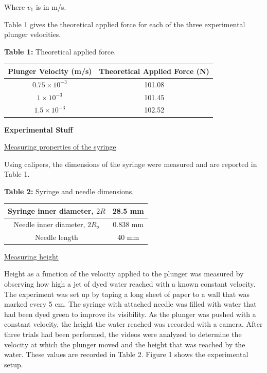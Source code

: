\documentclass{article}
\begin{document}
Where $v_{1}$ is in m/s.

Table 1 gives the theoretical applied force for each of the three experimental plunger velocities.
\begin{center}\textbf{Table 1:} Theoretical applied force. \end{center}
\begin{center}
\begin{tabular}{| c | c |}
\hline
\textbf{Plunger Velocity (m/s)} & \textbf{Theoretical Applied Force (N)} \\
\hline
$0.75 \times 10^{-3}$ & 101.08 \\  
\hline
$1 \times 10^{-3}$ & 101.45  \\
\hline
$1.5 \times 10^{-3}$ & 102.52  \\  
\hline
\end{tabular}
\end{center}


\textbf{Experimental Stuff}

\underline{Measuring properties of the syringe}

Using calipers, the dimensions of the syringe were measured and are reported in Table 1.

\begin{center}\textbf{Table 2:} Syringe and needle dimensions. \end{center}
\begin{center}
\begin{tabular}{| c | c |}
\hline
Syringe inner diameter, $2R$ & 28.5 mm \\ 
\hline
Needle inner diameter, $2R_{o}$ & 0.838 mm \\  
\hline
Needle length & 40 mm \\  
\hline
\end{tabular}
\end{center}

\underline{Measuring height}

Height as a function of the velocity applied to the plunger was measured by observing how high a jet of dyed water reached with a known constant velocity.
The experiment was set up by taping a long sheet of paper to a wall that was marked every 5 cm.
The syringe with attached needle was filled with water that had been dyed green to improve its visibility.
As the plunger was pushed with a constant velocity, the height the water reached was recorded with a camera.
After three trials had been performed, the videos were analyzed to determine the velocity at which the plunger moved and the height that was reached by the water.
These values are recorded in Table 2. Figure 1 shows the experimental setup.
\end{document}
